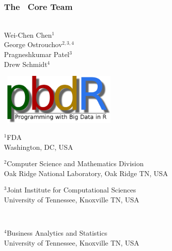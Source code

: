 \frame{  \maketitle   }

\setcounter{footnote}{0}

\begin{frame}[noframenumbering]
\frametitle{The \pbdR\ Core Team}
\begin{minipage}{1\textwidth}
  \vspace{-.6cm}
\begin{minipage}{3.7cm}
\ \\[.8cm]
Wei-Chen Chen$^1$ \\
George Ostrouchov$^{2,3,4}$ \\
Pragneshkumar Patel$^3$ \\
Drew Schmidt$^4$\\[2ex]
\end{minipage}
\begin{minipage}{7cm}
  \ \hfill \includegraphics[width=5.5cm]{../common/pics/logos/newpbdr}
\end{minipage}
\end{minipage}
  \begin{minipage}{2.2cm}\tiny
    $^1$FDA\\
    Washington, DC, USA
  \end{minipage}
  \hspace{1ex}
  \begin{minipage}{5cm}\tiny
    $^2$Computer Science and Mathematics Division\\
    Oak Ridge National Laboratory, Oak Ridge TN, USA
  \end{minipage}
  \hspace{1ex}
  \begin{minipage}{4cm}\tiny
    $^3$Joint Institute for Computational Sciences\\
    University of Tennessee, Knoxville TN, USA
  \end{minipage} \\[1ex]
  \begin{minipage}{4cm}\tiny
    $^4$Business Analytics and Statistics\\
    University of Tennessee, Knoxville TN, USA
  \end{minipage}


\end{frame}
